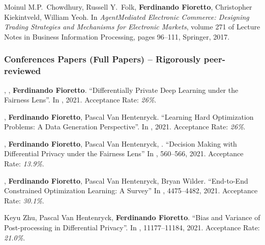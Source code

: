 \item
	Moinul M.P.~Chowdhury, Russell Y.~Folk, {\bf Ferdinando Fioretto}, Christopher Kiekintveld, William Yeoh. 
	In \emph{AgentMediated Electronic Commerce: Designing Trading Strategies and Mechanisms for Electronic Markets}, volume 271 of Lecture Notes in Business Information Processing, 
    pages 96–111, Springer, 2017.
\endEnum



\subsubsection*{\sc Conferences Papers (Full Papers) -- Rigorously peer-reviewed}
\renewcommand{\labelenumi}{c\theenumi.} 
\beginEnum
  \setcounter{enumi}{43}

  \item {}, , {\bf Ferdinando Fioretto}. 
  ``Differentially Private Deep Learning under the Fairness Lens''.
  In \procNeurIPS, 2021.
  Acceptance Rate: {\it 26\%}. %
  
  \item {}, {\bf Ferdinando Fioretto}, Pascal Van Hentenryck.
  ``Learning Hard Optimization Problems: A Data Generation Perspective''.
  In \procNeurIPS, 2021.
  Acceptance Rate: {\it 26\%}. %

	\item {}, {\bf Ferdinando Fioretto}, Pascal Van Hentenryck, .
	{``Decision Making with Differential Privacy under the Fairness Lens''}
	In \procIJCAI, 560--566, 2021.
	Acceptance Rate: {\it 13.9\%}. %

	\item {}, {\bf Ferdinando Fioretto}, Pascal Van Hentenryck, Bryan Wilder.
	{``End-to-End Constrained Optimization Learning: A Survey''}
	In \procIJCAI, 4475--4482, 2021.
	Acceptance Rate: {\it 30.1\%}.

	\item Keyu Zhu, Pascal Van Hentenryck, {\bf Ferdinando Fioretto}.
	{``Bias and Variance of Post-processing in Differential Privacy''}.
	In \procAAAI, 11177--11184, 2021.
    Acceptance Rate: {\it 21.0\%}. %

